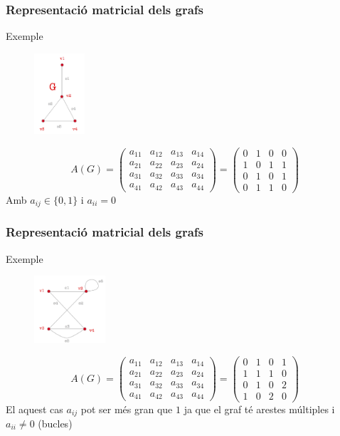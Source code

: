 \documentclass{beamer}
\begin{document}
\begin{frame}
\frametitle{Representació matricial dels grafs}
\begin{block}{Exemple}
\begin{figure}[h]
 \label{fig:volum}
\centering
\includegraphics[height=3cm]{g3}
\end{figure}

\[A(G) = \left(\begin{array}{cccc}a_{11} & a_{12} & a_{13} & a_{14} \\a_{21} & a_{22} & a_{23} & a_{24} \\a_{31} & a_{32} & a_{33} & a_{34} \\a_{41} & a_{42} & a_{43} & a_{44}\end{array}\right) = \left(\begin{array}{cccc}0 & 1 & 0 & 0 \\1 & 0 & 1 & 1 \\0 & 1 & 0 & 1 \\0 & 1 & 1 & 0\end{array}\right)\]
Amb $a_{ij}\in\{0,1\}$ i $a_{ii} = 0$
\end{block}
\end{frame}



\begin{frame}
\frametitle{Representació matricial dels grafs}
\begin{block}{Exemple}
\begin{figure}[h]
 \label{fig:volum}
\centering
\includegraphics[height=2.5cm]{g4}
\end{figure}
\[A(G) = \left(\begin{array}{cccc}a_{11} & a_{12} & a_{13} & a_{14} \\a_{21} & a_{22} & a_{23} & a_{24} \\a_{31} & a_{32} & a_{33} & a_{34} \\a_{41} & a_{42} & a_{43} & a_{44}\end{array}\right) = \left(\begin{array}{cccc}0 & 1 & 0 & 1 \\1 & 1 & 1 & 0 \\0 & 1 & 0 & 2 \\1 & 0 & 2 & 0\end{array}\right)\]
El aquest cas $a_{ij}$ pot ser més gran que $1$ ja que el graf té arestes múltiples i $a_{ii}\neq 0$ (bucles)
\end{block}
\end{frame}
\end{document}
